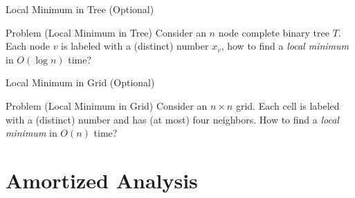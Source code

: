 \documentclass{beamer}
\begin{document}
\begin{frame}{Local Minimum in Tree (Optional)}
  \begin{exampleblock}{Problem (Local Minimum in Tree)}
    Consider an $n$ node complete binary tree $T$. Each node $v$ is labeled with
    a (distinct) number $x_v$, how to find a \emph{local minimum} in $O(\log n)$
    time?
  \end{exampleblock}
\end{frame}
\begin{frame}{Local Minimum in Grid (Optional)}
  \begin{exampleblock}{Problem (Local Minimum in Grid)}
    Consider an $n \times n$ grid. Each cell is labeled with a (distinct) number
    and has (at most) four neighbors. How to find a \emph{local minimum} in
    $O(n)$ time?
  \end{exampleblock}
\end{frame}
\section{Amortized Analysis}
\end{document}
